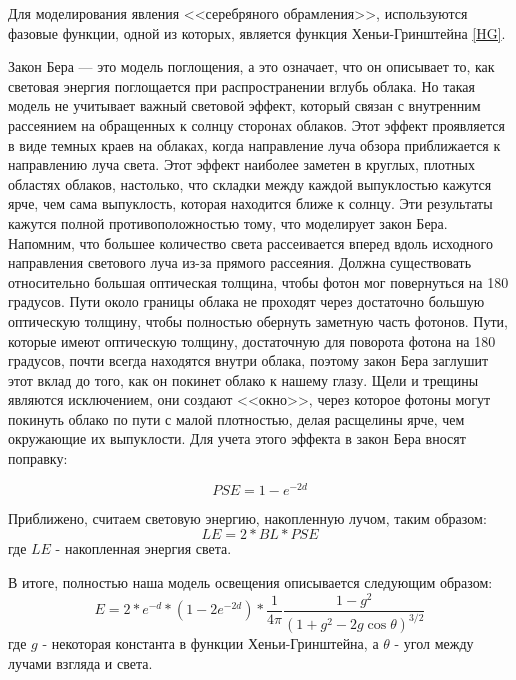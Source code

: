 Для моделирования явления <<серебряного обрамления>>, используются фазовые функции, одной из которых, является функция Хеньи-Гринштейна \eqref{HG}.

Закон Бера — это модель поглощения, а это означает, что он описывает то, как световая энергия поглощается при распространении вглубь облака. Но такая модель не учитывает важный световой эффект, который связан с внутренним рассеянием на обращенных к солнцу сторонах облаков. Этот эффект проявляется в виде темных краев на облаках, когда направление луча обзора приближается к направлению луча света. Этот эффект наиболее заметен в круглых, плотных областях облаков, настолько, что складки между каждой выпуклостью кажутся ярче, чем сама выпуклость, которая находится ближе к солнцу. Эти результаты кажутся полной противоположностью тому, что моделирует закон Бера.  Напомним, что большее количество света рассеивается вперед вдоль исходного направления светового луча из-за прямого рассеяния. Должна существовать относительно большая оптическая толщина, чтобы фотон мог повернуться на 180 градусов. Пути около границы облака не проходят через достаточно большую оптическую толщину, чтобы полностью обернуть заметную часть фотонов. Пути, которые имеют оптическую толщину, достаточную для поворота фотона на 180 градусов, почти всегда находятся внутри облака, поэтому закон Бера заглушит этот вклад до того, как он покинет облако к нашему глазу. Щели и трещины являются исключением, они создают <<окно>>, через которое фотоны могут покинуть облако по пути с малой плотностью, делая расщелины ярче, чем окружающие их выпуклости. Для учета этого эффекта в закон Бера вносят поправку:

\begin{equation}
	\label{sugar_powder}
	PSE = 1 - e ^ {-2 d}
\end{equation}

Приближено, считаем световую энергию, накопленную лучом, таким образом:
\begin{equation}
	\label{bsp}
	LE = 2 * BL * PSE
\end{equation}
где $ LE $ - накопленная энергия света. 

В итоге, полностью наша модель освещения описывается следующим образом:
\begin{equation}
	\label{light_model}
	E = 2 * e ^ {-d} * (1 - 2 e ^ {-2d}) * \frac{1}{4\pi} \frac{1 - g^2}{(1 + g^2 - 2g\cos \theta)^{3/2}}
\end{equation}
где $ g $ - некоторая константа в функции Хеньи-Гринштейна, а $ \theta $ - угол между лучами взгляда и света.

